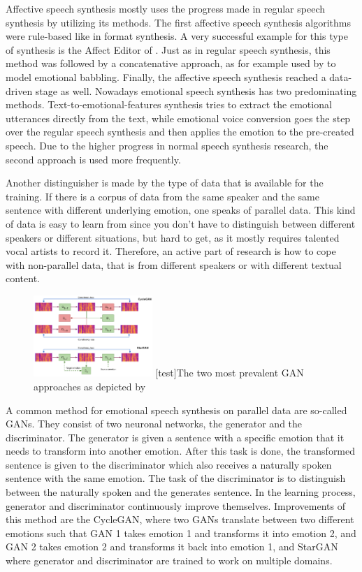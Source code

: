\documentclass[11pt]{article}
\begin{document}
Affective speech synthesis mostly uses the progress made in regular speech synthesis by utilizing its methods. The first affective speech synthesis algorithms were rule-based like in format synthesis. A very successful example for this type of synthesis is the Affect Editor of \cite{cahn_generation_2000}. Just as in regular speech synthesis, this method was followed by a concatenative approach, as for example used by \cite{pierre-yves_production_2003} to model emotional babbling. Finally, the affective speech synthesis reached a data-driven stage as well.
Nowadays emotional speech synthesis has two predominating methods. Text-to-emotional-features synthesis tries to extract the emotional utterances directly from the text, while emotional voice conversion goes the step over the regular speech synthesis and then applies the emotion to the pre-created speech. Due to the higher progress in normal speech synthesis research, the second approach is used more frequently.

Another distinguisher is made by the type of data that is available for the training. If there is a corpus of data from the same speaker and the same sentence with different underlying emotion, one speaks of parallel data. This kind of data is easy to learn from since you don’t have to distinguish between different speakers or different situations, but hard to get, as it mostly requires talented vocal artists to record it. Therefore, an active part of research is how to cope with non-parallel data, that is from different speakers or with different textual content.

\begin{figure}[h]
 \centering
\includegraphics[width=0.4\textwidth]{"Bilder/GAN.PNG"}
[test]{The two most prevalent GAN approaches as depicted by \cite{triantafyllopoulos_overview_2023}}
\end{figure}

A common method for emotional speech synthesis on parallel data are so-called GANs. They consist of two neuronal networks, the generator and the discriminator. The generator is given a sentence with a specific emotion that it needs to transform into another emotion. After this task is done, the transformed sentence is given to the discriminator which also receives a naturally spoken sentence with the same emotion. The task of the discriminator is to distinguish between the naturally spoken and the generates sentence. In the learning process, generator and discriminator continuously improve themselves. Improvements of this method are the CycleGAN, where two GANs translate between two different emotions such that GAN 1 takes emotion 1 and transforms it into emotion 2, and GAN 2 takes emotion 2 and transforms it back into emotion 1, and StarGAN where generator and discriminator are trained to work on multiple domains.
\end{document}
